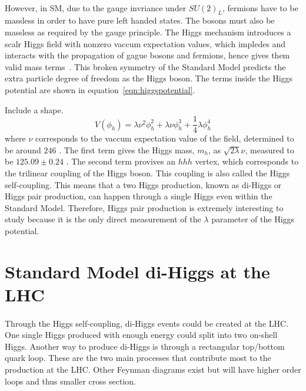 \paragraph{}
However, in SM, due to the gauge invriance under $SU(2)_{L}$, fermions have to be massless in order to have pure left handed states. 
The bosons must also be massless as required by the gauge principle. 
The Higgs mechanism introduces a scalr Higgs field with nonzero vaccum expectation values, which impledes and interacts with the propagation of gague bosons and fermions, hence gives them valid mass terms~\cite{Tully}. 
This broken symmetry of the Standard Model predicts the extra particle degree of freedom as the Higgs boson. The terms inside the Higgs potential are shown in equation~\ref{eqn:higgspotential}.

Include a shape.
\begin{equation}
\label{eqn:higgspotential}
V(\phi_{h}) = \lambda \nu^2 \phi_{h} ^2  + \lambda \nu \phi_{h} ^3  + \frac{1}{4}\lambda \phi_{h} ^4 
\end{equation}
where $\nu$ corresponds to the vaccum expectation value of the field, determined to be around $246$ \GeV.
The first term gives the Higgs mass, $m_h$, as $ \sqrt{2\lambda}\nu$, measured to be $125.09 \pm 0.24$ \GeV. 
The second term provives an $hhh$ vertex, which corresponds to the trilinear coupling of the Higgs boson. This coupling is also called the Higgs self-coupling.
This means that a two Higgs production, known as di-Higgs or Higgs pair production, can happen through a single Higgs even within the Standard Model. 
Therefore, Higgs pair production is extremely interesting to study because it is the only direct measurement of the $\lambda$ parameter of the Higgs potential.

\section{Standard Model di-Higgs at the LHC}
\paragraph{}
Through the Higgs self-coupling, di-Higgs events could be created at the LHC. One single Higgs produced with enough energy could split into two on-shell Higgs. Another way to produce di-Higgs is through a rectangular top/bottom quark loop. These are the two main processes that contribute most to the production at the LHC. Other Feynman diagrams exist but will have higher order loops and thus smaller cross section.
